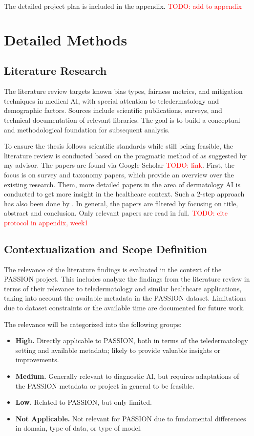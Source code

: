 \documentclass[12pt, a4paper, oneside]{book}   	%
\renewcommand{\todo}[1]{\textcolor{red}{TODO: #1}}
\begin{document}
		The detailed project plan is included in the appendix. \todo{add to appendix}
		
		\section{Detailed Methods}
		
		\subsection{Literature Research}
		The literature review targets known bias types, fairness metrics, and mitigation techniques in medical \gls{AI}, with special attention to \gls{teledermatology} and demographic factors. Sources include scientific publications, surveys, and technical documentation of relevant libraries. The goal is to build a conceptual and methodological foundation for subsequent analysis.
		
		To ensure the thesis follows scientific standards while still being feasible, the literature review is conducted based on the pragmatic method of \textcite{Alake_2021} as suggested by my advisor. The papers are found via Google Scholar \todo{link}. First, the focus is on survey and taxonomy papers, which provide an overview over the existing research. Them, more detailed papers in the area of dermatology \gls{AI} is conducted to get more insight in the healthcare context. Such a 2-step approach has also been done by \textcite{Chen_2024}. In general, the papers are filtered by focusing on title, abstract and conclusion. Only relevant papers are read in full. \todo{cite protocol in appendix, week1}
		
		
		\subsection{Contextualization and Scope Definition}
		The relevance of the literature findings is evaluated in the context of the PASSION project. This includes analyze the findings from the literature review in terms of their relevance to \gls{teledermatology} and similar healthcare applications, taking into account the available metadata in the PASSION dataset. Limitations due to dataset constraints or the available time are documented for future work.
		
		The relevance will be categorized into the following groups:
		\begin{itemize}
			\item \textbf{High.} Directly applicable to PASSION, both in terms of the \gls{teledermatology} setting and available metadata; likely to provide valuable insights or improvements. 
			\item \textbf{Medium.} Generally relevant to diagnostic \gls{AI}, but requires adaptations of the PASSION metadata or project in general to be feasible.
			\item \textbf{Low.} Related to PASSION, but only limited.
			\item \textbf{Not Applicable.} Not relevant for PASSION due to fundamental differences in domain, type of data, or type of model.
		\end{itemize}
		
\end{document}
